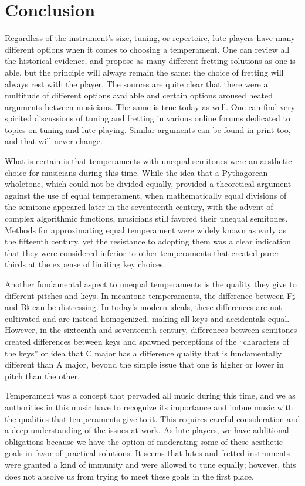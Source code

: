 \section{Conclusion}

Regardless of the instrument's size, tuning, or repertoire, lute players have many different options
when it comes to choosing a temperament.  One can review all the historical evidence, and propose as
many different fretting solutions as one is able, but the principle will always remain the same: the
choice of fretting will always rest with the player. The sources are quite clear that there were a
multitude of different options available and certain options aroused heated arguments between
musicians. The same is true today as well. One can find very spirited discussions of tuning and
fretting in various online forums dedicated to topics on tuning and lute playing. Similar arguments
can be found in print too, and that will never change. \autocite{DD:4}

What is certain is that temperaments with unequal semitones were an aesthetic choice for musicians
during this time.  While the idea that a Pythagorean wholetone, which could not be divided equally,
provided a theoretical argument against the use of equal temperament, when mathematically equal
divisions of the semitone appeared  later in the seventeenth century, with the advent of complex
algorithmic functions,  musicians still favored their unequal semitones.  Methods for approximating
equal temperament were widely known as early as the fifteenth century, yet the resistance to
adopting them was a clear indication that they were considered inferior to other temperaments that
created purer thirds at the expense of limiting key choices.

Another fundamental aspect to unequal temperaments is the quality they give to different pitches and
keys.  In meantone temperaments, the difference between F$\sharp$ and B$\flat$ can be  distressing.
In today's modern ideals, these differences are not cultivated and are instead homogenized, making
all keys and accidentals equal.  However, in the sixteenth and seventeenth century, differences
between semitones created differences between keys and spawned perceptions of the ``characters of
the keys'' or idea that C major has a difference quality that is  fundamentally different than A
major, beyond the simple issue that one is higher or lower in pitch than the other.

Temperament was a concept that pervaded all music during this time, and we as authorities in this
music have to recognize its importance and imbue music with the qualities that temperaments give to
it.  This requires careful consideration and a deep understanding of the  issues at work.  As lute
players, we have additional obligations because we have the option of moderating some of these
aesthetic goals in favor of practical solutions.  It seems that lutes and fretted instruments were
granted a kind of immunity and were allowed to tune equally; however, this does not absolve us from
trying to meet these goals in the first place.


